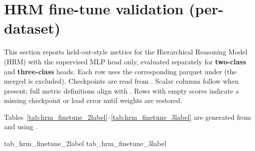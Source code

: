 \section{HRM fine-tune validation (per-dataset)}
\label{sec:hrm_finetune_validation}

This section reports held-out-style metrics for the Hierarchical Reasoning Model (HRM) with the supervised MLP head only, evaluated separately for \textbf{two-class} and \textbf{three-class} heads. Each row uses the corresponding parquet under  (the merged  is excluded). Checkpoints are read from . Scalar columns follow  when present; full metric definitions align with . Rows with empty scores indicate a missing checkpoint or load error until weights are restored.

Tables~\ref{tab:hrm_finetune_2label}--\ref{tab:hrm_finetune_3label} are generated from  and  using .

{tab_hrm_finetune_2label}
{tab_hrm_finetune_3label}
